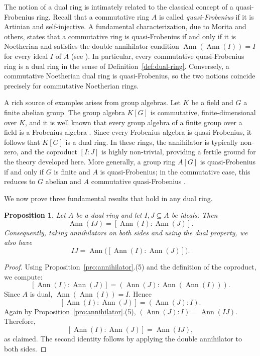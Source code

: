 \documentclass{amsart}
\newtheorem{proposition}{Proposition}
\DeclareMathOperator{\ann}{Ann}
\begin{document}
The notion of a dual ring is intimately related to the classical concept of a quasi-Frobenius ring. Recall that a commutative ring $A$ is called \emph{quasi-Frobenius} if it is Artinian and self-injective. A fundamental characterization, due to Morita and others, states that a commutative ring is quasi-Frobenius if and only if it is Noetherian and satisfies the double annihilator condition $\ann(\ann(I)) = I$ for every ideal $I$ of $A$ (see \cite{lam1999lectures}). In particular, every commutative quasi-Frobenius ring is a dual ring in the sense of Definition~\ref{def:dual-ring}. Conversely, a commutative Noetherian dual ring is quasi-Frobenius, so the two notions coincide precisely for commutative Noetherian rings.

A rich source of examples arises from group algebras. Let $K$ be a field and $G$ a finite abelian group. The group algebra $K[G]$ is commutative, finite-dimensional over $K$, and it is well known that every group algebra of a finite group over a field is a Frobenius algebra \cite{curtis1962representation}. Since every Frobenius algebra is quasi-Frobenius, it follows that $K[G]$ is a dual ring. In these rings, the annihilator is typically non-zero, and the coproduct $[I:J]$ is highly non-trivial, providing a fertile ground for the theory developed here. More generally, a group ring $A[G]$ is quasi-Frobenius if and only if $G$ is finite and $A$ is quasi-Frobenius; in the commutative case, this reduces to $G$ abelian and $A$ commutative quasi-Frobenius \cite{nicholson2003quasi}.

We now prove three fundamental results that hold in any dual ring.

\begin{proposition}\label{prop:dual-annihilator-product}
Let $A$ be a dual ring and let $I,J\subseteq A$ be ideals. Then
\[
\ann(IJ) = [\ann(I):\ann(J)].
\]
Consequently, taking annihilators on both sides and using the dual property, we also have
\[
IJ = \ann\!\big([\ann(I):\ann(J)]\big).
\]
\end{proposition}

\begin{proof}
Using Proposition~\ref{pro:annihilator}.(5) and the definition of the coproduct, we compute:
\[
[\ann(I):\ann(J)] = (\ann(J) : \ann(\ann(I))).
\]
Since $A$ is dual, $\ann(\ann(I)) = I$. Hence
\[
[\ann(I):\ann(J)] = (\ann(J) : I).
\]
Again by Proposition~\ref{pro:annihilator}.(5), $(\ann(J) : I) = \ann(IJ)$. Therefore,
\[
[\ann(I):\ann(J)] = \ann(IJ),
\]
as claimed. The second identity follows by applying the double annihilator to both sides.
\end{proof}
\end{document}
